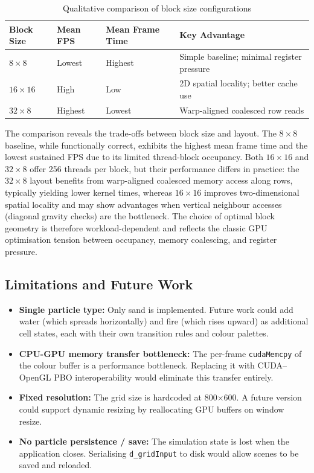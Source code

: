 \documentclass[12pt,a4paper]{article}
\begin{document}
    \begin{table}[h]
    \centering
    \begin{tabular}{|l|l|l|l|}
    \hline
    \textbf{Block Size} & \textbf{Mean FPS} & \textbf{Mean Frame Time} & \textbf{Key Advantage} \\
    \hline
    $8\times8$   & Lowest  & Highest & Simple baseline; minimal register pressure \\
    $16\times16$ & High    & Low     & 2D spatial locality; better cache use \\
    $32\times8$  & Highest & Lowest  & Warp-aligned coalesced row reads \\
    \hline
    \end{tabular}
    \caption{Qualitative comparison of block size configurations}
    \label{Table:blockcompare}
    \end{table}

    The comparison reveals the trade-offs between block size and layout. The $8\times8$ 
    baseline, while functionally correct, exhibits the highest mean frame time and the 
    lowest sustained FPS due to its limited thread-block occupancy. Both $16\times16$ 
    and $32\times8$ offer 256 threads per block, but their performance differs in 
    practice: the $32\times8$ layout benefits from warp-aligned coalesced memory access 
    along rows, typically yielding lower kernel times, whereas $16\times16$ improves 
    two-dimensional spatial locality and may show advantages when vertical neighbour 
    accesses (diagonal gravity checks) are the bottleneck. The choice of optimal block 
    geometry is therefore workload-dependent and reflects the classic GPU optimisation 
    tension between occupancy, memory coalescing, and register pressure.

	\subsection{Limitations and Future Work}
	\begin{itemize}
		\item \textbf{Single particle type:} Only sand is implemented. Future work could add water 
        (which spreads horizontally) and fire (which rises upward) as additional cell states, 
        each with their own transition rules and colour palettes.
		\item \textbf{CPU-GPU memory transfer bottleneck:} The per-frame \texttt{cudaMemcpy} of 
        the colour buffer is a performance bottleneck. Replacing it with CUDA--OpenGL PBO 
        interoperability would eliminate this transfer entirely.
		\item \textbf{Fixed resolution:} The grid size is hardcoded at 800$\times$600. 
        A future version could support dynamic resizing by reallocating GPU buffers on window resize.
        \item \textbf{No particle persistence / save:} The simulation state is lost when the 
        application closes. Serialising \texttt{d\_gridInput} to disk would allow scenes to be saved and reloaded.
	\end{itemize}
\end{document}
